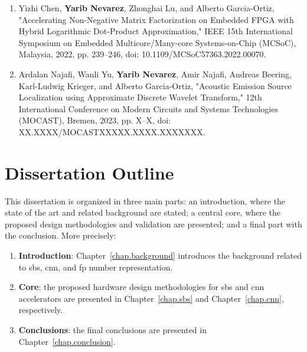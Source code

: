 \begin{enumerate}
	\item Yizhi Chen, \textbf{Yarib Nevarez}, Zhonghai Lu, and Alberto Garcia-Ortiz, "Accelerating Non-Negative Matrix Factorization on Embedded FPGA with Hybrid Logarithmic Dot-Product Approximation," 
	 IEEE 15th International Symposium on Embedded Multicore/Many-core Systems-on-Chip (MCSoC), Malaysia, 2022, pp. 239--246, doi: 10.1109/MCSoC57363.2022.00070.
	
	\item Ardalan Najafi, Wanli Yu, \textbf{Yarib Nevarez}, Amir Najafi, Andreas Beering, Karl-Ludwig Krieger, and Alberto Garcia-Ortiz, "Acoustic Emission Source Localization using Approximate Discrete Wavelet Transform,"  12th International Conference on Modern Circuits and Systems Technologies (MOCAST), Bremen, 2023, pp. X--X, doi: XX.XXXX/MOCASTXXXXX.XXXX.XXXXXXX.
	
\end{enumerate}

\section{Dissertation Outline}

This dissertation is organized in three main parts: an introduction, where
the state of the art and related background are stated; a central core, where the proposed design methodologies and validation are presented; and a final part with the conclusion. More precisely:

\begin{enumerate}[I]
	\item \textbf{Introduction}: Chapter~\ref{chap.background} introduces the background related to \gls{sbs}, \gls{cnn}, and \gls{fp} number representation.
	\item \textbf{Core}: the proposed hardware design methodologies for \gls{sbs} and \gls{cnn} accelerators are presented in Chapter~\ref{chap.sbs} and Chapter~\ref{chap.cnn}, respectively.
	\item \textbf{Conclusions}: the final conclusions are presented in Chapter~\ref{chap.conclusion}.
\end{enumerate}
